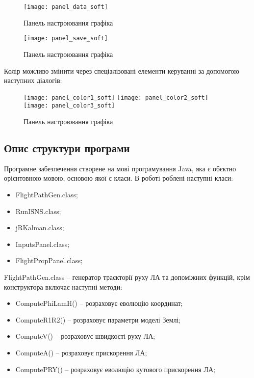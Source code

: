 \begin{figure}[t]
\centering
\texttt{[image: panel\_data\_soft]}
\caption{Панель настроювання графіка}\label{fig:panel_data_soft}
\end{figure}

\begin{figure}[t]
\centering
\texttt{[image: panel\_save\_soft]}
\caption{Панель настроювання графіка}\label{fig:panel_save_soft}
\end{figure}
Колір можливо змінити через спеціалізовані елементи керуванні за допомогою наступних діалогів: 
\begin{figure}[t]
\centering
\texttt{[image: panel\_color1\_soft]}
\texttt{[image: panel\_color2\_soft]}
\texttt{[image: panel\_color3\_soft]}
\caption{Панель настроювання графіка}\label{fig:panel_color_soft}
\end{figure}

\subsection{Опис структури програми}

Програмне забезпечення створене на мові програмування Java, яка є обєктно орієнтовною мовою, основою якої є класи. В роботі роблені наступні класи:
\begin{itemize}
 \item FlightPathGen.class;
 \item RunISNS.class;
 \item jRKalman.class;
 \item InputsPanel.class;
 \item FlightPropPanel.class;
\end{itemize}

FlightPathGen.class -- генератор траєкторії руху ЛА та допоміжних функцій, крім конструктора включає наступні методи:

\begin{itemize}
 \item ComputePhiLamH() -- розраховує еволюцію координат;
 \item ComputeR1R2() -- розраховує параметри моделі Землі;
 \item ComputeV() -- розраховує швидкості руху ЛА;
 \item ComputeA() -- розраховує прискорення ЛА;
 \item ComputePRY() -- розраховує еволюцію кутового прискорення ЛА;
\end{itemize}


